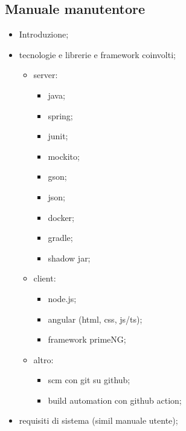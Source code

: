 \subsection{Manuale manutentore}
	\begin{itemize}
		\item Introduzione;
		
		\item tecnologie e librerie e framework coinvolti;
		\begin{itemize}
		
		
		\item server:
		\begin{itemize}
		
		\item java;
		
		\item spring;
		
		\item junit;
		
		\item mockito;
		
		\item gson;
		
		\item json;
		
		\item docker;
		
		\item gradle;
		
		\item shadow jar;
	\end{itemize}
		
		\item client:
		\begin{itemize}
		
		\item node.js;
		
		\item angular (html, css, js/ts);
		
		\item framework primeNG;
	\end{itemize}
	\item altro:
	\begin{itemize}
		\item scm con git su github;
		
		\item build automation con github action;
	\end{itemize}
	\end{itemize}
	\item requisiti di sistema (simil manuale utente);
	

\end{itemize}
